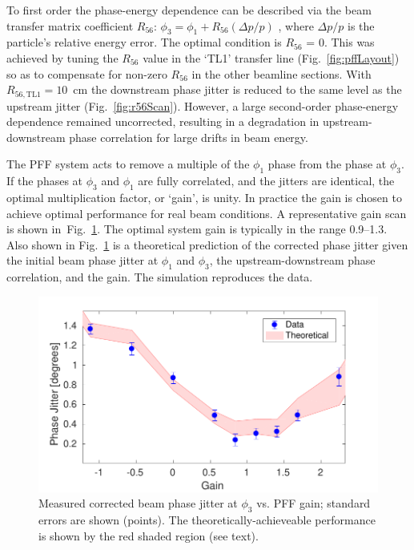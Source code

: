 \documentclass[%
 reprint,
 superscriptaddress,
 amsmath,
 amssymb,
 prl,
]{revtex4-1}
\begin{document}
To first order the phase-energy dependence can be described via the beam 
transfer matrix coefficient 
\(R_{56}\): \(\phi_3 = \phi_1 + R_{56}(\Delta p / p)\)
, where \(\Delta p / p\) is the particle's relative energy error.
The optimal condition is \(R_{56}\) = 0.
This was achieved by tuning the \(R_{56}\) value in the `TL1' transfer line 
(Fig.~\ref{fig:pffLayout}) so as to compensate for non-zero \(R_{56}\) in the 
other beamline sections. With \(R_{56, \mathrm{TL1}}=10\)~cm the 
downstream phase jitter is reduced to the same level as the upstream jitter 
(Fig.~\ref{fig:r56Scan}). 
However, a large second-order phase-energy dependence remained uncorrected, 
resulting in a degradation in upstream-downstream phase correlation for large 
drifts in beam energy.

The PFF system acts to remove a multiple of the \(\phi_1\) phase from the phase 
at \(\phi_3\). If the phases at \(\phi_3\) and \(\phi_1\) are fully 
correlated, 
and the jitters are identical, the optimal multiplication factor, or `gain',  
is unity.
In practice the gain is chosen to achieve optimal 
performance for real beam conditions. A representative gain scan is shown 
in~Fig.~\ref{fig:gScan}. The optimal system gain is typically in the range 
0.9--1.3. Also shown in Fig.~\ref{fig:gScan} is a theoretical prediction of the 
corrected phase jitter given the initial beam phase jitter at \(\phi_1\) and 
\(\phi_3\), the upstream-downstream phase correlation, and the gain. The 
simulation reproduces the data.

\begin{figure}
\includegraphics[width=\columnwidth]{figs/gScan}
\caption{\label{fig:gScan}Measured corrected beam  phase jitter at \(\phi_3\) 
vs. PFF gain; standard errors are shown (points). The theoretically-achieveable 
performance is shown by the red shaded region (see text).}
\end{figure}
\end{document}
